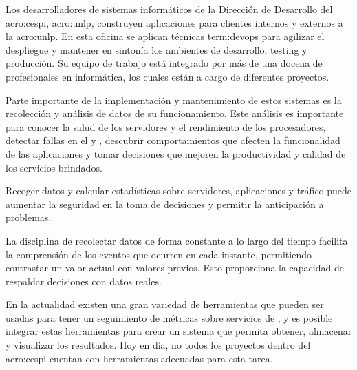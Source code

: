 Los desarrolladores de sistemas informáticos de la Dirección de Desarrollo del
\gls{acro:cespi}, \gls{acro:unlp}, construyen aplicaciones para clientes
internos y externos a la \gls{acro:unlp}. En esta oficina se aplican técnicas
\gls{term:devops} para agilizar el despliegue y mantener en sintonía los
ambientes de desarrollo, testing y producción. Su equipo de trabajo está
integrado por más de una docena de profesionales en informática, los cuales
están a cargo de diferentes proyectos.

Parte importante de la implementación y mantenimiento de estos sistemas es la
recolección y análisis de datos de su funcionamiento. Este análisis es
importante para conocer la salud de los servidores y el rendimiento de los
procesadores, detectar fallas en el  y , descubrir
comportamientos que afecten la funcionalidad de las aplicaciones y tomar
decisiones que mejoren la productividad y calidad de los servicios brindados.

Recoger datos y calcular estadísticas sobre servidores, aplicaciones y tráfico
puede aumentar la seguridad en la toma de decisiones y permitir la anticipación
a problemas.

La disciplina de recolectar datos de forma constante a lo largo del tiempo
facilita la comprensión de los eventos que ocurren en cada instante,
permitiendo contrastar un valor actual con valores previos. Esto proporciona la
capacidad de respaldar decisiones con datos reales.

En la actualidad existen una gran variedad de herramientas que pueden ser
usadas para tener un seguimiento de métricas sobre servicios de , y es
posible integrar estas herramientas para crear un sistema que permita obtener,
almacenar y visualizar los resultados. Hoy en día, no todos los proyectos
dentro del \gls{acro:cespi} cuentan con herramientas adecuadas para esta tarea.
